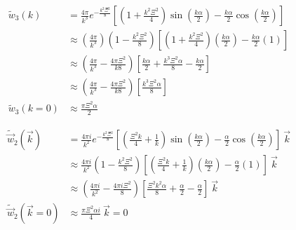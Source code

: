 \documentclass[double,12pt]{revtex4-2}
\begin{document}
\begin{align}
  \widetilde{w}_3(k) &= \frac{4\pi}{k^3}e^{-\frac{k^2\Xi^2}{8}}
    \left[\left(1+\frac{k^2\Xi^2}{4}\right)\sin\left(\frac{k\alpha}{2}
    \right)-\frac{k\alpha}{2}\cos\left(\frac{k\alpha}{2}\right)\right]\\
    &\approx \left(\frac{4\pi}{k^3}\right)\left(1-\frac{k^2\Xi^2}{8}
    \right)\left[\left(1+\frac{k^2\Xi^2}{4}\right)\left(\frac{k\alpha}
    {2}\right)-\frac{k\alpha}{2}\left(1\right)\right] \\ 
    &\approx \left(\frac{4\pi}{k^3} -\frac{4\pi\Xi^2}{k8}\right)
    \left[\frac{k\alpha} {2}+\frac{k^3\Xi^2\alpha}{8}
    -\frac{k\alpha}{2}\right]  \\
    &\approx \left(\frac{4\pi}{k^3} -\frac{4\pi\Xi^2}{k8}\right)
    \left[\frac{k^3\Xi^2\alpha}{8}\right]  \\
     \widetilde{w}_3(k=0) & \approx \frac{\pi\Xi^2\alpha}{2}
\end{align}

\begin{align}
   \widetilde{\vec{w}}_2(\vec{k})&= \frac{4\pi{i}}{k^2}
   e^{-\frac{k^2\Xi^2}{8}}
   \left[\left(\frac{\Xi^2k}{4}+\frac{1}{k}\right)\sin\left(
   \frac{k\alpha}{2}\right)
   -\frac{\alpha}{2}\cos\left(\frac{k\alpha}{2}\right)\right]
   {~}\vec{k} \\
    & \approx  \frac{4\pi{i}}{k^2}\left(1-\frac{k^2\Xi^2}{8}\right)
    \left[\left(\frac{\Xi^2k}{4}+\frac{1}{k}\right)\left(\frac{k\alpha}
    {2}\right)-\frac{\alpha}{2}\left(1\right)\right]{~}\vec{k}\\
    & \approx  \left(\frac{4\pi{i}}{k^2}-\frac{4\pi i\Xi^2}{8}\right)
    \left[\frac{\Xi^2k^2\alpha}{8}+\frac{\alpha}{2}-\frac{\alpha}{2}
    \right]{~}\vec{k} \\
    \widetilde{\vec w}_2(\vec k=0) & \approx \frac{\pi\Xi^2\alpha i}{4} 
    {~}\vec{k} = 0
\end{align}
\end{document}
